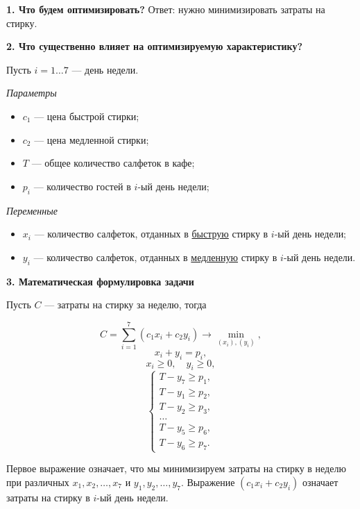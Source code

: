 \textbf{1. Что будем оптимизировать?} Ответ: нужно минимизировать затраты на стирку.

\bigskip

\textbf{2. Что существенно влияет на оптимизируемую характеристику?}

Пусть $i = 1 \dots 7$ --- день недели.

\bigskip

\textit{Параметры}

\begin{itemize}[nosep]	
	\item $c_1$ --- цена быстрой стирки;
	
	\item $c_2$ --- цена медленной стирки;
	
	\item $T$ --- общее количество салфеток в кафе;
	
	\item $p_i$ --- количество гостей в $i$-ый день недели;
\end{itemize}

\bigskip

\textit{Переменные}

\begin{itemize}[nosep]	
	\item $x_i$ --- количество салфеток, отданных в \underline{быструю} стирку в $i$-ый день недели;
	
	\item $y_i$ --- количество салфеток, отданных в \underline{медленную} стирку в $i$-ый день недели.
\end{itemize}

\bigskip

\textbf{3. Математическая формулировка задачи}

Пусть $C$ --- затраты на стирку за неделю, тогда

\[C = \sum_{i=1}^7 (c_1 x_i + c_2 y_i) \to \min_{(x_i), (y_i)},\]
\[x_i + y_i = p_i,\]
\[x_i \ge 0, \quad y_i \ge 0,\]
\[\begin{cases}
	T - y_7 \ge p_1, \\
	T - y_1 \ge p_2, \\
	T - y_2 \ge p_3, \\
	\dots \\
	T - y_5 \ge p_6, \\
	T - y_6 \ge p_7.
\end{cases}\]

Первое выражение означает, что мы минимизируем затраты на стирку в неделю при различных $x_1, x_2, \dots, x_7$ и $y_1, y_2, \dots, y_7$. Выражение $(c_1 x_i + c_2 y_i)$ означает затраты на стирку в $i$-ый день недели.

